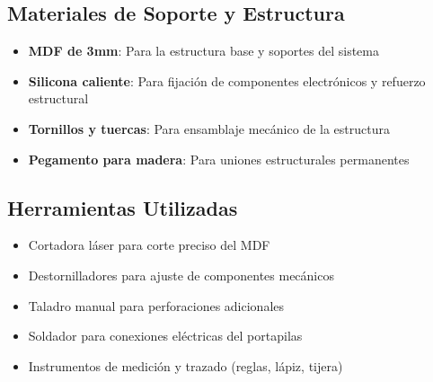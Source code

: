 \subsection{Materiales de Soporte y Estructura}

\begin{itemize}
    \item \textbf{MDF de 3mm}: Para la estructura base y soportes del sistema
    \item \textbf{Silicona caliente}: Para fijación de componentes electrónicos y refuerzo estructural
    \item \textbf{Tornillos y tuercas}: Para ensamblaje mecánico de la estructura
    \item \textbf{Pegamento para madera}: Para uniones estructurales permanentes
\end{itemize}

\subsection{Herramientas Utilizadas}

\begin{itemize}
    \item Cortadora láser para corte preciso del MDF
    \item Destornilladores para ajuste de componentes mecánicos
    \item Taladro manual para perforaciones adicionales
    \item Soldador para conexiones eléctricas del portapilas
    \item Instrumentos de medición y trazado (reglas, lápiz, tijera)
\end{itemize}


